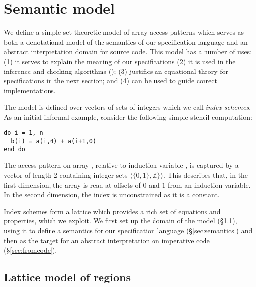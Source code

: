 \documentclass[acmlarge,review,anonymous]{acmart}\settopmatter{printfolios=true}
\theoremstyle{definition}
\newtheorem{defn}{Definition}
\theoremstyle{plain}
\begin{document}
\section{Semantic model}
\label{sec:model}

\noindent
We define a simple set-theoretic model of array access patterns
which serves as both a denotational model of the semantics
of our specification language and an abstract interpretation
domain for source code. This model has a number of uses: 
(1) it serves to explain the meaning of our specifications
(2) it is used in the inference and checking algorithms
(); (3) justifies an equational theory for
specifications in the next section; and (4) can be used to guide
correct implementations.

The model is defined over vectors of sets of integers which we call
\emph{index schemes}.  As an initial informal example, consider the
following simple stencil computation:
%
\begin{verbatim}
do i = 1, n
  b(i) = a(i,0) + a(i+1,0)
end do
\end{verbatim}
%
The access pattern on array , relative
to induction variable , is captured
by a vector of length 2 containing integer sets $\langle{\{0, 1\},
  \mathbb{Z}\}}\rangle$. This describes that, in the first dimension,
the array is read at offsets of $0$ and $1$ from an induction
variable. In the second dimension, the index is unconstrained
as it is a constant.

Index schemes form a lattice which provides a rich set of equations
and properties, which we exploit. We first set up the 
domain of the model (\S\ref{sec:domain}), using it to define a semantics
for our specification language (\S\ref{sec:semantics}) and then as
the target for an abstract interpretation on imperative
code (\S\ref{sec:fromcode}).

\subsection{Lattice model of regions}
\label{sec:domain} 

\end{document}
